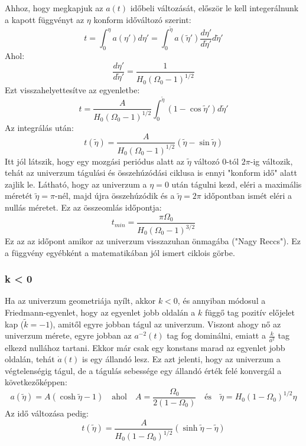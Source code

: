\documentclass[../main.tex]{subfiles}
\begin{document}
Ahhoz, hogy megkapjuk az $a(t)$ időbeli változását, először le kell integerálnunk a kapott függvényt az $\eta$ konform időváltozó szerint:
\begin{equation}
    t = \int_0^{\eta} a(\eta') d \eta' = \int_0^{\tilde{\eta}} a(\tilde{\eta}') \frac{d \eta'}{d \tilde{\eta}'} d \tilde{\eta}'
\end{equation}
Ahol:
\begin{equation}
    \frac{d \eta'}{d \tilde{\eta}'} = \frac{1}{H_0 (\Omega_0 - 1)^{1/2}}
\end{equation}
Ezt visszahelyettesítve az egyenletbe:
\begin{equation}
    t = \frac{A}{H_0 (\Omega_0 - 1)^{1/2}} \int_0^{\tilde{\eta}} (1 - \cos \tilde{\eta}') d \tilde{\eta}'
\end{equation}
Az integrálás után:
\begin{equation}
    t(\tilde{\eta}) = \frac{A}{H_0 (\Omega_0 - 1)^{1/2}} (\tilde{\eta} - \sin \tilde{\eta})
\end{equation}
Itt jól látszik, hogy egy mozgási periódus alatt az $\tilde{\eta}$ változó $0$-tól $2 \pi$-ig változik, tehát az univerzum tágulási és összehúzódási ciklusa is ennyi "konform idő" alatt zajlik le.
Látható, hogy az univerzum a $\eta = 0$ után tágulni kezd, eléri a maximális méretét $\tilde{\eta} = \pi$-nél, majd újra összehúzódik és a $\tilde{\eta} = 2 \pi$ időpontban ismét eléri a nullás méretet.
Ez az összeomlás időpontja:
\begin{equation}
    t_{min} = \frac{\pi \Omega_0}{H_0 (\Omega_0 - 1)^{3/2}}
\end{equation}
Ez az az időpont amikor az univerzum visszazuhan önmagába ("Nagy Reccs"). Ez a függvény egyébként a matematikában jól ismert ciklois görbe.

\subsubsection*{k < 0}
Ha az univerzum geometriája nyílt, akkor $k < 0$, és annyiban módosul a Friedmann-egyenlet, hogy az egyenlet jobb oldalán a $k$ függő tag pozitív előjelet kap ($\tilde{k} = -1$), amitől egyre jobban tágul az univerzum.
Viszont ahogy nő az univerzum mérete, egyre jobban az $a^{-2}(t)$ tag fog dominálni, emiatt a $\frac{k}{a^2}$ tag elkezd nullához tartani. Ekkor már csak egy konstans marad az egyenlet jobb oldalán,
tehát $\dot{a}(t)$ is egy állandó lesz. Ez azt jelenti, hogy az univerzum a végtelenségig tágul, de a tágulás sebessége egy állandó érték felé konvergál a következőképpen:
\begin{equation}
    a(\tilde{\eta}) = A (\cosh \tilde{\eta} - 1) \quad \text{ahol} \quad A = \frac{\Omega_0}{2(1 - \Omega_0)} \quad \text{és} \quad \tilde{\eta} = H_0 (1 - \Omega_0)^{1/2} \eta
\end{equation}
Az idő változása pedig:
\begin{equation}
    t(\tilde{\eta}) = \frac{A}{H_0 (1 - \Omega_0)^{1/2}} (\sinh \tilde{\eta} - \tilde{\eta})
\end{equation}
\end{document}
